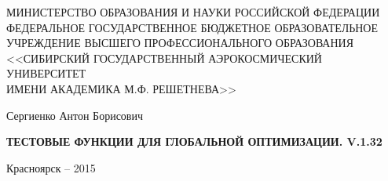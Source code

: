 \thispagestyle{empty}

\begin{center}
	\MakeUppercase{Министерство образования и науки Российской Федерации} \\ 
	\MakeUppercase{федеральное государственное бюджетное образовательное} \\
	\MakeUppercase{учреждение высшего профессионального образования } \\
	\MakeUppercase{<<Сибирский государственный аэрокосмический университет} \\
	\MakeUppercase{имени академика М.Ф. Решетнева>>}
\end{center}

\vspace{20mm}


\vspace{30mm}
\begin{center}
{\large Сергиенко Антон Борисович}
\end{center}

\vspace{5mm}
\begin{center}
{\bf \large \MakeUppercase{Тестовые функции для глобальной оптимизации. v.1.32}
\par}

\vspace{10mm}


\vspace{10mm}

\end{center}

\vspace{70mm}


\vspace{20mm}
\begin{center}
{Красноярск -- 2015}
\end{center}

\newpage